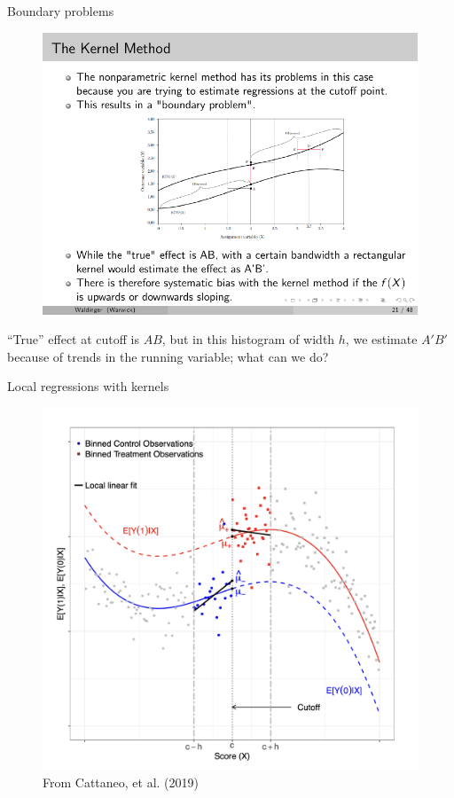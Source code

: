 \documentclass{beamer}
\begin{document}
\begin{frame}{Boundary problems}
	
		\begin{figure}
		\includegraphics[scale=1.2]{./lecture_includes/kernel_1.pdf}
		\end{figure}

``True'' effect at cutoff is $AB$, but in this histogram of width $h$, we estimate $A'B'$ because of trends in the running variable; what can we do?

	
\end{frame}


\begin{frame}{Local regressions with kernels}

		\begin{figure}
		\includegraphics[scale=0.24]{./lecture_includes/cattaneo_local}
		\caption{From Cattaneo, et al. (2019)}
		\end{figure}

\end{frame}
\end{document}
